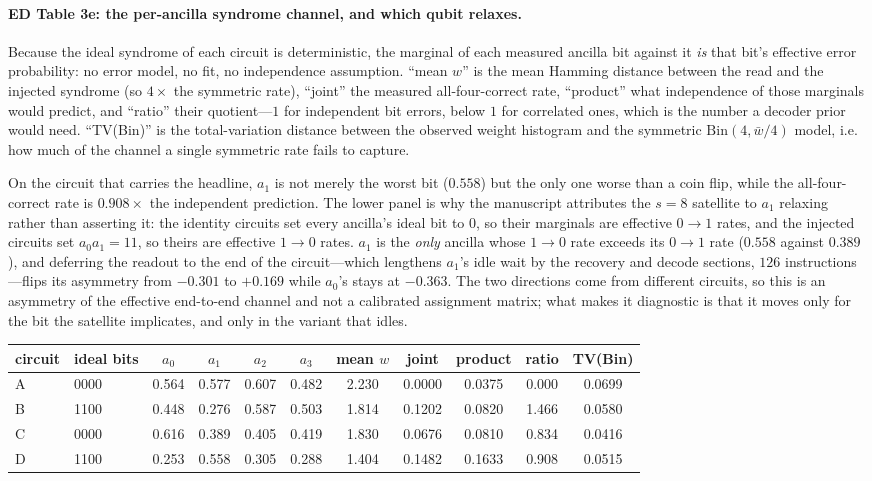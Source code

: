 \documentclass[10pt,a4paper]{article}
\begin{document}
\paragraph*{ED Table 3e: the per-ancilla syndrome channel, and which qubit relaxes.}
Because the ideal syndrome of each circuit is deterministic, the marginal of each
measured ancilla bit against it \emph{is} that bit's effective error probability:
no error model, no fit, no independence assumption.  ``mean $w$'' is the mean
Hamming distance between the read and the injected syndrome (so $4\times$ the
symmetric rate), ``joint'' the measured all-four-correct rate, ``product'' what
independence of those marginals would predict, and ``ratio'' their quotient---$1$
for independent bit errors, below $1$ for correlated ones, which is the number a
decoder prior would need.  ``TV(Bin)'' is the total-variation distance between the
observed weight histogram and the symmetric $\mathrm{Bin}(4,\bar w/4)$ model, i.e.
how much of the channel a single symmetric rate fails to capture.

On the circuit that carries the headline, $a_1$ is not merely the worst bit
($0.558$) but the only one worse than a coin flip, while the all-four-correct rate is
$0.908\times$ the independent prediction.  The lower panel is why the manuscript
attributes the $s=8$ satellite to $a_1$ relaxing rather than asserting it: the
identity circuits set every ancilla's ideal bit to $0$, so their marginals are
effective $0\to1$ rates, and the injected circuits set $a_0a_1=11$, so theirs are
effective $1\to0$ rates.  $a_1$ is the \emph{only} ancilla whose $1\to0$ rate
exceeds its $0\to1$ rate ($0.558$ against $0.389$), and deferring the readout to the
end of the circuit---which lengthens $a_1$'s idle wait by the recovery and decode
sections, $126$ instructions---flips its asymmetry from $-0.301$ to $+0.169$ while
$a_0$'s stays at $-0.363$.  The two directions come from different circuits, so
this is an asymmetry of the effective end-to-end channel and not a calibrated
assignment matrix; what makes it diagnostic is that it moves only for the bit the
satellite implicates, and only in the variant that idles.
\begin{longtable}{llccccccccc}
\toprule circuit & ideal bits & $a_0$ & $a_1$ & $a_2$ & $a_3$ & mean $w$ & joint & product & ratio & TV(Bin) \\ \midrule
A & 0000 & 0.564 & 0.577 & 0.607 & 0.482 & 2.230 & 0.0000 & 0.0375 & 0.000 & 0.0699 \\
B & 1100 & 0.448 & 0.276 & 0.587 & 0.503 & 1.814 & 0.1202 & 0.0820 & 1.466 & 0.0580 \\
C & 0000 & 0.616 & 0.389 & 0.405 & 0.419 & 1.830 & 0.0676 & 0.0810 & 0.834 & 0.0416 \\
D & 1100 & 0.253 & 0.558 & 0.305 & 0.288 & 1.404 & 0.1482 & 0.1633 & 0.908 & 0.0515 \\
\bottomrule\end{longtable}
\end{document}
